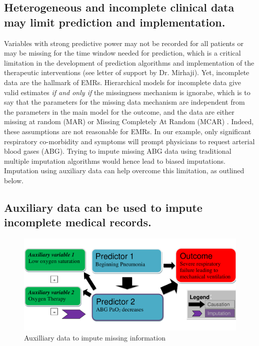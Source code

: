 \documentclass[11pt,notitlepage]{article}
\begin{document}
\subsection*{Heterogeneous and incomplete clinical data may limit prediction and implementation.}
Variables with strong predictive power may not be recorded for all patients 
or may be missing for the time window needed for prediction, which is a critical limitation 
in the development of prediction algorithms and implementation of the 
therapeutic interventions (see letter of support by Dr. Mirhaji). Yet, incomplete data are the hallmark of EMRs. 
Hierarchical models for incomplete data give valid estimates 
\textit{if and only if} the missingness mechanism is ignorabe, which is to say that the parameters 
for the missing data mechanism are independent from the parameters in the main model for the 
outcome, and the data are either missing at random (MAR) or Missing Completely At Random 
(MCAR) \cite{Rubin1976}. Indeed, these assumptions are not reasonable for EMRs. In our example, only 
significant respiratory co-morbidity and symptoms will prompt physicians to request arterial blood gases (ABG). Trying to 
impute missing ABG data using traditional multiple imputation algorithms would hence lead to biased 
imputations. Imputation using auxiliary data can help overcome this limitation, as outlined below.

\subsection*{Auxiliary data can be used to impute incomplete medical records.} 

\begin{figure} 
 \vspace{-25pt}
 \includegraphics[scale=0.4]{Figures/Bayesian_imputation.pdf}
    \vspace{-20pt}
  \caption{Auxilliary data to impute missing information}
   \vspace{-15pt}
   \label{fig:Imputation_fig}
\end{figure}
\end{document}
